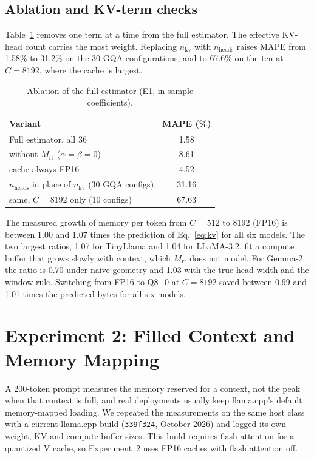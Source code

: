 \documentclass[conference]{IEEEtran}
\begin{document}
\subsection{Ablation and KV-term checks}
Table~\ref{tab:abl} removes one term at a time from the full estimator. The effective KV-head count carries the most weight. Replacing $n_{\mathrm{kv}}$ with $n_{\mathrm{heads}}$ raises MAPE from 1.58\% to 31.2\% on the 30 GQA configurations, and to 67.6\% on the ten at $C = 8192$, where the cache is largest.

\begin{table}[t]
\centering
\caption{Ablation of the full estimator (E1, in-sample coefficients).}
\label{tab:abl}
\footnotesize
\begin{tabular}{@{}lc@{}}
\toprule
Variant & MAPE (\%) \\
\midrule
Full estimator, all 36 & 1.58 \\
\quad without $M_{\mathrm{rt}}$ ($\alpha = \beta = 0$) & 8.61 \\
\quad cache always FP16 & 4.52 \\
\quad $n_{\mathrm{heads}}$ in place of $n_{\mathrm{kv}}$ (30 GQA configs) & 31.16 \\
\quad\quad same, $C = 8192$ only (10 configs) & 67.63 \\
\bottomrule
\end{tabular}
\end{table}

The measured growth of memory per token from $C = 512$ to $8192$ (FP16) is between 1.00 and 1.07 times the prediction of Eq.~\eqref{eq:kv} for all six models. The two largest ratios, 1.07 for TinyLlama and 1.04 for LLaMA-3.2, fit a compute buffer that grows slowly with context, which $M_{\mathrm{rt}}$ does not model. For Gemma-2 the ratio is 0.70 under naive geometry and 1.03 with the true head width and the window rule. Switching from FP16 to Q8\_0 at $C = 8192$ saved between 0.99 and 1.01 times the predicted bytes for all six models.

\section{Experiment 2: Filled Context and Memory Mapping}
\label{sec:e2}
A 200-token prompt measures the memory reserved for a context, not the peak when that context is full, and real deployments usually keep llama.cpp's default memory-mapped loading. We repeated the measurements on the same host class with a current llama.cpp build (\texttt{339f324}, October 2026) and logged its own weight, KV and compute-buffer sizes. This build requires flash attention for a quantized V cache, so Experiment~2 uses FP16 caches with flash attention off.
\end{document}
